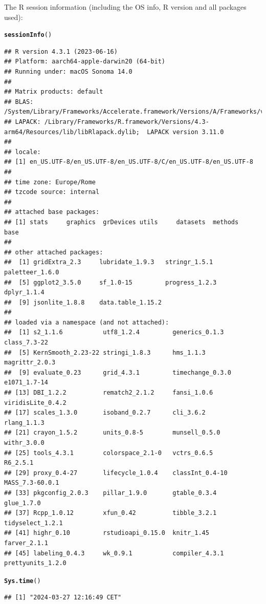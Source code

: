 \documentclass{article}\usepackage[]{graphicx}\usepackage[]{xcolor}
\makeatletter
\newcommand{\hlstd}[1]{\textcolor[rgb]{0.345,0.345,0.345}{#1}}%
\newcommand{\hlkwd}[1]{\textcolor[rgb]{0.737,0.353,0.396}{\textbf{#1}}}%
\newenvironment{kframe}{%
 \def\at@end@of@kframe{}%
 \ifinner\ifhmode%
  \def\at@end@of@kframe{\end{minipage}}%
  \begin{minipage}{\columnwidth}%
 \fi\fi%
 \def\FrameCommand##1{\hskip\@totalleftmargin \hskip-\fboxsep
 \colorbox{shadecolor}{##1}\hskip-\fboxsep
     \hskip-\linewidth \hskip-\@totalleftmargin \hskip\columnwidth}%
 \MakeFramed {\advance\hsize-\width
   \@totalleftmargin\z@ \linewidth\hsize
   \@setminipage}}%
 {\par\unskip\endMakeFramed%
 \at@end@of@kframe}
\newenvironment{knitrout}{}{} %
\makeatother
\begin{document}
The R session information (including the OS info, R version and all
packages used):

\begin{knitrout}
\color{fgcolor}\begin{kframe}
\begin{alltt}
\hlkwd{sessionInfo}\hlstd{()}
\end{alltt}
\begin{verbatim}
## R version 4.3.1 (2023-06-16)
## Platform: aarch64-apple-darwin20 (64-bit)
## Running under: macOS Sonoma 14.0
## 
## Matrix products: default
## BLAS:   /System/Library/Frameworks/Accelerate.framework/Versions/A/Frameworks/vecLib.framework/Versions/A/libBLAS.dylib 
## LAPACK: /Library/Frameworks/R.framework/Versions/4.3-arm64/Resources/lib/libRlapack.dylib;  LAPACK version 3.11.0
## 
## locale:
## [1] en_US.UTF-8/en_US.UTF-8/en_US.UTF-8/C/en_US.UTF-8/en_US.UTF-8
## 
## time zone: Europe/Rome
## tzcode source: internal
## 
## attached base packages:
## [1] stats     graphics  grDevices utils     datasets  methods   base     
## 
## other attached packages:
##  [1] gridExtra_2.3     lubridate_1.9.3   stringr_1.5.1     paletteer_1.6.0  
##  [5] ggplot2_3.5.0     sf_1.0-15         progress_1.2.3    dplyr_1.1.4      
##  [9] jsonlite_1.8.8    data.table_1.15.2
## 
## loaded via a namespace (and not attached):
##  [1] s2_1.1.6           utf8_1.2.4         generics_0.1.3     class_7.3-22      
##  [5] KernSmooth_2.23-22 stringi_1.8.3      hms_1.1.3          magrittr_2.0.3    
##  [9] evaluate_0.23      grid_4.3.1         timechange_0.3.0   e1071_1.7-14      
## [13] DBI_1.2.2          rematch2_2.1.2     fansi_1.0.6        viridisLite_0.4.2 
## [17] scales_1.3.0       isoband_0.2.7      cli_3.6.2          rlang_1.1.3       
## [21] crayon_1.5.2       units_0.8-5        munsell_0.5.0      withr_3.0.0       
## [25] tools_4.3.1        colorspace_2.1-0   vctrs_0.6.5        R6_2.5.1          
## [29] proxy_0.4-27       lifecycle_1.0.4    classInt_0.4-10    MASS_7.3-60.0.1   
## [33] pkgconfig_2.0.3    pillar_1.9.0       gtable_0.3.4       glue_1.7.0        
## [37] Rcpp_1.0.12        xfun_0.42          tibble_3.2.1       tidyselect_1.2.1  
## [41] highr_0.10         rstudioapi_0.15.0  knitr_1.45         farver_2.1.1      
## [45] labeling_0.4.3     wk_0.9.1           compiler_4.3.1     prettyunits_1.2.0
\end{verbatim}
\begin{alltt}
\hlkwd{Sys.time}\hlstd{()}
\end{alltt}
\begin{verbatim}
## [1] "2024-03-27 12:16:49 CET"
\end{verbatim}
\end{kframe}
\end{knitrout}
\end{document}

